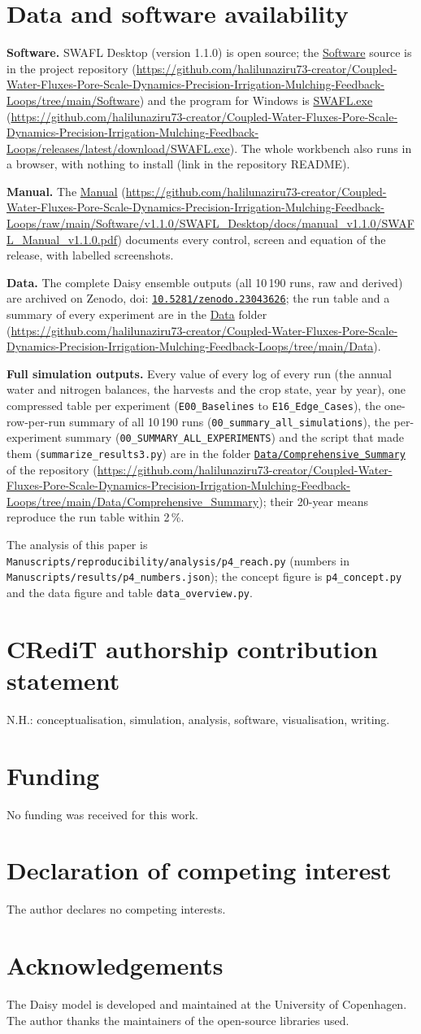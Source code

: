\documentclass[preprint,12pt,authoryear]{elsarticle}
\newcommand{\doihl}[1]{doi: \href{https://doi.org/#1}{\nolinkurl{#1}}}
\newcommand{\repourl}{https://github.com/halilunaziru73-creator/Coupled-Water-Fluxes-Pore-Scale-Dynamics-Precision-Irrigation-Mulching-Feedback-Loops}
\newcommand{\dataurl}{\repourl/tree/main/Data}
\newcommand{\softurl}{\repourl/tree/main/Software}
\newcommand{\datalink}{\href{\dataurl}{Data}}
\newcommand{\softlink}{\href{\softurl}{Software}}
\newcommand{\manuallink}{\href{\manualurl}{Manual}}
\newcommand{\downloadlink}{\href{\exeurl}{SWAFL.exe}}
\newcommand{\manualurl}{https://github.com/halilunaziru73-creator/Coupled-Water-Fluxes-Pore-Scale-Dynamics-Precision-Irrigation-Mulching-Feedback-Loops/raw/main/Software/v1.1.0/SWAFL_Desktop/docs/manual_v1.1.0/SWAFL_Manual_v1.1.0.pdf}
\newcommand{\exeurl}{https://github.com/halilunaziru73-creator/Coupled-Water-Fluxes-Pore-Scale-Dynamics-Precision-Irrigation-Mulching-Feedback-Loops/releases/latest/download/SWAFL.exe}
\newcommand{\csurl}{https://github.com/halilunaziru73-creator/Coupled-Water-Fluxes-Pore-Scale-Dynamics-Precision-Irrigation-Mulching-Feedback-Loops/tree/main/Data/Comprehensive_Summary}
\newcommand{\cslink}{\href{\csurl}{\nolinkurl{Data/Comprehensive_Summary}}}
\newcommand{\csavail}{\par\smallskip\textbf{Full simulation outputs.} Every value of every log of every run (the annual water and nitrogen balances, the harvests and the crop state, year by year), one compressed table per experiment (\texttt{E00\_Baselines} to \texttt{E16\_Edge\_Cases}), the one-row-per-run summary of all 10\,190 runs (\texttt{00\_summary\_all\_simulations}), the per-experiment summary (\texttt{00\_SUMMARY\_ALL\_EXPERIMENTS}) and the script that made them (\texttt{summarize\_results3.py}) are in the folder \cslink{} of the repository (\url{\csurl}); their 20-year means reproduce the run table within 2\,\%.}
\newcommand{\suiteavail}{%
\textbf{Software.} SWAFL Desktop (version 1.1.0) is open source; the \softlink{} source is in the project repository (\url{\softurl}) and the program for Windows is \downloadlink{} (\url{\exeurl}). The whole workbench also runs in a browser, with nothing to install (link in the repository README).
\par\smallskip\textbf{Manual.} The \manuallink{} (\url{\manualurl}) documents every control, screen and equation of the release, with labelled screenshots.
\par\smallskip\textbf{Data.} The complete Daisy ensemble outputs (all 10\,190 runs, raw and derived) are archived on Zenodo, \doihl{10.5281/zenodo.23043626}; the run table and a summary of every experiment are in the \datalink{} folder (\url{\dataurl}).\csavail
}
\begin{document}
\section*{Data and software availability}
\suiteavail
\par\smallskip The analysis of this paper is \texttt{Manuscripts/reproducibility/analysis/p4\_reach.py} (numbers in \texttt{Manuscripts/results/p4\_numbers.json}); the concept figure is \texttt{p4\_concept.py} and the data figure and table \texttt{data\_overview.py}.

\section*{CRediT authorship contribution statement}
N.H.: conceptualisation, simulation, analysis, software, visualisation, writing.

\section*{Funding}
No funding was received for this work.

\section*{Declaration of competing interest}
The author declares no competing interests.

\section*{Acknowledgements}
The Daisy model is developed and maintained at the University of Copenhagen. The author thanks the maintainers of the open-source libraries used.


\appendix
\end{document}
